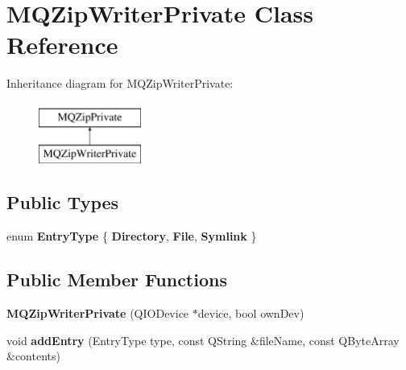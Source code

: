 \hypertarget{class_m_q_zip_writer_private}{}\section{M\+Q\+Zip\+Writer\+Private Class Reference}
\label{class_m_q_zip_writer_private}
Inheritance diagram for M\+Q\+Zip\+Writer\+Private\+:\begin{figure}[H]
\begin{center}
\leavevmode
\includegraphics[height=2.000000cm]{class_m_q_zip_writer_private}
\end{center}
\end{figure}
\subsection*{Public Types}
\begin{DoxyCompactItemize}
\item 
\mbox{\label{class_m_q_zip_writer_private_a80086eb5458e78b316df265169643bac}} 
enum {\bfseries Entry\+Type} \{ {\bfseries Directory}, 
{\bfseries File}, 
{\bfseries Symlink}
 \}
\end{DoxyCompactItemize}
\subsection*{Public Member Functions}
\begin{DoxyCompactItemize}
\item 
\mbox{\label{class_m_q_zip_writer_private_aeab2a9cfc2411ff42b0352ad00d18409}} 
{\bfseries M\+Q\+Zip\+Writer\+Private} (Q\+I\+O\+Device $\ast$device, bool own\+Dev)
\item 
\mbox{\label{class_m_q_zip_writer_private_a46a37305aba1234e7a8d73e23d37f6d8}} 
void {\bfseries add\+Entry} (Entry\+Type type, const Q\+String \&file\+Name, const Q\+Byte\+Array \&contents)
\end{DoxyCompactItemize}
